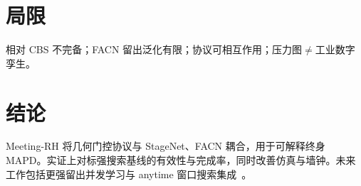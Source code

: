 \documentclass[11pt,a4paper]{ctexart}
\begin{document}
\section{局限}
相对 CBS 不完备；FACN 留出泛化有限；协议可相互作用；压力图$\neq$工业数字孪生。

\section{结论}
Meeting-RH 将几何门控协议与 StageNet、FACN 耦合，用于可解释终身 MAPD。实证上对标强搜索基线的有效性与完成率，同时改善仿真与墙钟。未来工作包括更强留出并发学习与 anytime 窗口搜索集成~\citep{li2021mapflns}。



\end{document}
